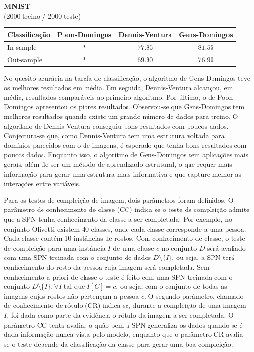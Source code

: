 \documentclass[12pt]{article}
\theoremstyle{plain}
\numberwithin{equation}{section}
\begin{document}
\begin{table}[h]
\begin{tabular}{l|cccccccccc}
  \end{tabular}\\~\\
  \textbf{MNIST}\\(2000 treino / 2000 teste)\vspace{0.25cm}\\
  \begin{tabular}{l|ccc}
    Classificação & Poon-Domingos & Dennis-Ventura & Gens-Domingos \\
    \hline
    In-sample & $\ast$ & $77.85$ & $81.55$ \\
    Out-sample & $\ast$ & $69.90$ & $76.90$ \\
  \end{tabular}
\end{table}

No quesito acurácia na tarefa de classificação, o algoritmo de Gens-Domingos teve os melhores
resultados em média. Em seguida, Dennis-Ventura alcançou, em média, resultados comparáveis ao
primeiro algoritmo. Por último, o de Poon-Domingos apresentou os piores resultados. Observou-se que
Gens-Domingos tem melhores resultados quando existe um grande número de dados para treino. O
algoritmo de Dennis-Ventura conseguiu bons resultados com poucos dados. Conjectura-se que, como
Dennis-Ventura tem uma estrutura voltada para domínios parecidos com o de imagens, é esperado que
tenha bons resultados com poucos dados. Enquanto isso, o algoritmo de Gens-Domingos tem aplicações
mais gerais, além de ser um método de aprendizado estrutural, o que requer mais informação para
gerar uma estrutura mais informativa e que capture melhor as interações entre variáveis.

Para os testes de compleição de imagem, dois parâmetros foram definidos. O parâmetro de
conhecimento de classe (CC) indica se o teste de compleição admite que a SPN tenha conhecimento da
classe a ser completada. Por exemplo, no conjunto Olivetti existem 40 classes, onde cada classe
corresponde a uma pessoa. Cada classe contém 10 instâncias de rostos. Com conhecimento de classe, o
teste de compleição para uma instância $I$ de uma classe $c$ no conjunto $D$ será avaliado com uma
SPN treinada com o conjunto de dados $D\setminus\{I\}$, ou seja, a SPN terá conhecimento do rosto
da pessoa cuja imagem será completada. Sem conhecimento a priori de classe o teste é feito com uma
SPN treinada com o conjunto $D\setminus\{I\}, \forall I$ tal que $I[C]=c$, ou seja, com o conjunto
de todas as imagens cujos rostos não pertençam a pessoa $c$. O segundo parâmetro, chamado de
conhecimento de rótulo (CR) indica se, durante a compleição de uma imagem $I$, foi dada como parte
da evidência o rótulo da imagem a ser completada. O parâmetro CC tenta avaliar o quão bem a SPN
generaliza os dados quando se é dada informação nunca vista pelo modelo, enquanto que o parâmetro
CR avalia se o teste depende da classificação da classe para gerar uma boa compleição.
\end{document}
